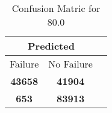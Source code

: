 \begin{table}[] 
\caption{Confusion Matric for 80.0} 
\label{Table: Prediction Accuracy-DMD80.0OnlySunEKF-ignoreReflectionEKF-top2-Reflection} 
\centering 
\begin{tabular} 
 {@{}ccc@{}} 
\toprule 
\multicolumn{2}{c}{\textbf{Predicted}}
 \\ \midrule 
\multicolumn{1}{|c|}{Failure} & 
\multicolumn{1}{c|}{No Failure}
 \\ \midrule 
\multicolumn{1}{|c|}{\color{green}\textbf{43658}} & 
\multicolumn{1}{c|}{\color{red}\textbf{41904}}
 \\ \midrule 
\multicolumn{1}{|c|}{\color{red}\textbf{653}} & 
\multicolumn{1}{c|}{\color{green}\textbf{83913}}
 \\ \bottomrule 
\end{tabular} 
\end{table} 
